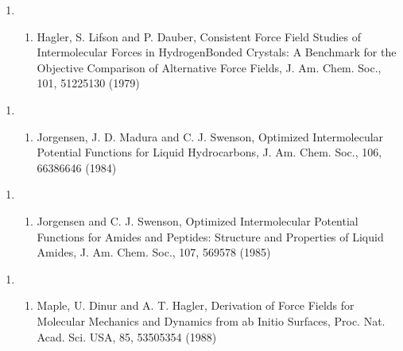 \documentclass[letterpaper,11pt,english]{sphinxmanual}
\begin{document}
\begin{enumerate}
%
\item {} \begin{enumerate}
%
\setcounter{enumii}{19}
\item {} 
Hagler, S. Lifson and P. Dauber, Consistent Force Field Studies of Intermolecular Forces in Hydrogen\sphinxhyphen{}Bonded Crystals:  A Benchmark for the Objective Comparison of Alternative Force Fields, J. Am. Chem. Soc., 101, 5122\sphinxhyphen{}5130 (1979)

\end{enumerate}

\end{enumerate}
\begin{enumerate}
%
\setcounter{enumi}{22}
\item {} \begin{enumerate}
%
\setcounter{enumii}{11}
\item {} 
Jorgensen, J. D. Madura and C. J. Swenson, Optimized Intermolecular Potential Functions for Liquid Hydrocarbons, J. Am. Chem. Soc., 106, 6638\sphinxhyphen{}6646 (1984)

\end{enumerate}

\end{enumerate}
\begin{enumerate}
%
\setcounter{enumi}{22}
\item {} \begin{enumerate}
%
\setcounter{enumii}{11}
\item {} 
Jorgensen and C. J. Swenson, Optimized Intermolecular Potential Functions for Amides and Peptides: Structure and Properties of Liquid Amides, J. Am. Chem. Soc., 107, 569\sphinxhyphen{}578 (1985)

\end{enumerate}

\end{enumerate}
\begin{enumerate}
%
\setcounter{enumi}{9}
\item {} \begin{enumerate}
%
\setcounter{enumii}{17}
\item {} 
Maple, U. Dinur and A. T. Hagler, Derivation of Force Fields for Molecular Mechanics and Dynamics from ab Initio Surfaces, Proc. Nat. Acad. Sci. USA, 85, 5350\sphinxhyphen{}5354 (1988)

\end{enumerate}

\end{enumerate}
\end{document}
